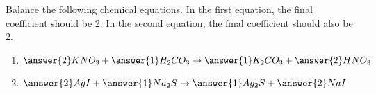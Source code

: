 \documentclass{ximera}
\author{Zack Reed}
\begin{document}
\begin{problem}

Balance the following chemical equations. In the first equation, the final coefficient should be 2. In the second equation, the final coefficient should also be 2.

\begin{enumerate}

    \item $\answer{2}KNO_3+\answer{1}H_2CO_3\rightarrow \answer{1}K_2CO_3+\answer{2}HNO_3$
    
    \item $\answer{2}AgI+\answer{1}Na_2S\rightarrow \answer{1}Ag_2S+\answer{2}NaI$
    
\end{enumerate}

\end{problem}
\end{document}
